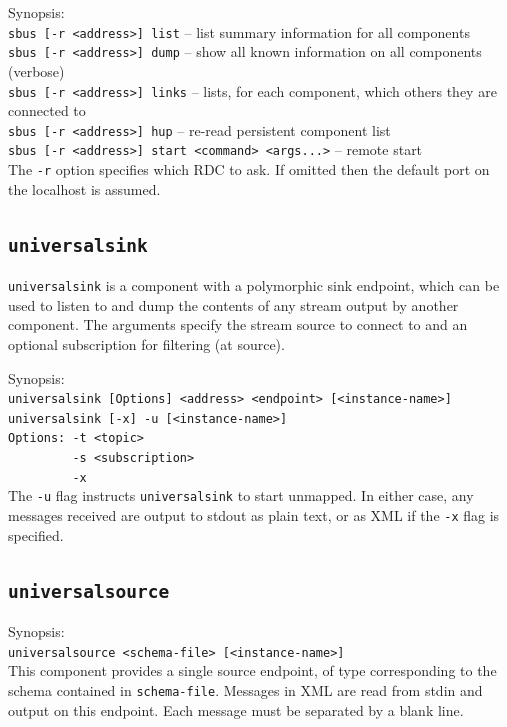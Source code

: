 \documentclass[12pt,a4paper,twoside]{article}
\renewcommand{\_}{\texttt{\symbol{95}}}
\begin{document}
Synopsis:\\
\verb^sbus [-r <address>] list^ -- list summary information for all components\\
\verb^sbus [-r <address>] dump^ -- show all known information on all components (verbose)\\
\verb^sbus [-r <address>] links^ -- lists, for each component, which others they are
connected to\\
\verb^sbus [-r <address>] hup^ -- re-read persistent component list\\
\verb^sbus [-r <address>] start <command> <args...>^ -- remote start\\

The \verb^-r^ option specifies which RDC to ask. If omitted then the
default port on the localhost is assumed.

\subsection{\texttt{universalsink}}

\verb^universalsink^ is a component with a polymorphic sink endpoint,
which can be used to listen to and dump the contents of any stream
output by another component. The arguments specify the stream
source to connect to and an optional subscription for filtering
(at source).

Synopsis:\\
\verb^universalsink [Options] <address> <endpoint> [<instance-name>]^\\
\verb^universalsink [-x] -u [<instance-name>]^\\
\verb^Options: -t <topic>^\\
\verb^         -s <subscription>^\\
\verb^         -x^\\

The \verb^-u^ flag instructs \verb^universalsink^ to start unmapped.
In either case, any messages received are output to stdout
as plain text, or as XML if the \verb^-x^ flag is specified.

\subsection{\texttt{universalsource}}

Synopsis:\\
\verb^universalsource <schema-file> [<instance-name>]^\\

This component provides a single source endpoint, of type corresponding
to the schema contained in \verb^schema-file^. Messages in XML are
read from stdin and output on this endpoint. Each message must be
separated by a blank line.
\end{document}
